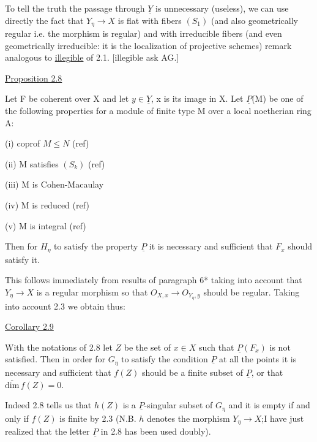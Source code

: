 \documentclass[11pt]{article}
\newcommand{\scanpage}[1]{\par\bigskip\noindent{\small\sffamily[scan #1]}\par}
\newcommand{\mspage}[1]{{\small\sffamily[p.\,#1]}}
\newcommand{\uline}[1]{\underline{#1}}
\begin{document}
To tell the truth the passage through $\underline{Y}$ is unnecessary
(useless), we can use directly the fact that $Y_{\eta} \to X$ is flat with
fibers $(S_{1})$ (and also geometrically regular i.e. the morphism is
regular) and with irreducible fibers (and even geometrically
irreducible: it is the localization of projective schemes) remark
analogous to \uline{illegible} of 2.1.  [illegible ask AG.]

\uline{Proposition 2.8}

Let F be coherent over X and let $y \in \underline{Y}$, x is its image in X.
Let $\underline{P}$(M) be one of the following properties for a module of finite
type M over a local noetherian ring A:

(i) \quad coprof $M \leq N$ \qquad (ref)

(ii) \quad M satisfies $(S_{k})$ \qquad (ref)

(iii) \quad M is Cohen-Macaulay

(iv) \quad M is reduced \qquad (ref)

(v) \quad M is integral \qquad (ref)

Then for $H_{\eta}$ to satisfy the property $\underline{P}$ it is necessary and
sufficient that $F_{x}$ should satisfy it.

This follows immediately from results of paragraph 6* taking
into account that $Y_{\eta} \to X$ is a regular morphism so that
$O_{X,x} \to O_{Y_{\eta},y}$ should be regular.  Taking into account 2.3 we obtain
thus:

\clearpage
\scanpage{24/14}
\mspage{14}

\uline{Corollary 2.9}

With the notations of 2.8 let $Z$ be the set of $x \in X$ such that
$\underline{P}(F_x)$ is not satisfied. Then in order for $G_\eta$ to satisfy the
condition $\underline{P}$ at all the points it is necessary and sufficient that
$f(Z)$ should be a finite subset of $\underline{P}$, or that $\overline{\mathrm{dim}}\, f(Z) = 0$.

Indeed 2.8 tells us that $h(Z)$ is a $\underline{P}$-singular subset of $G_\eta$ and
it is empty if and only if $f(Z)$ is finite by 2.3 (N.B. $h$ denotes
the morphism $Y_\eta \to X$;I have just realized that the letter $\underline{P}$ in 2.8
has been used doubly).
\end{document}
